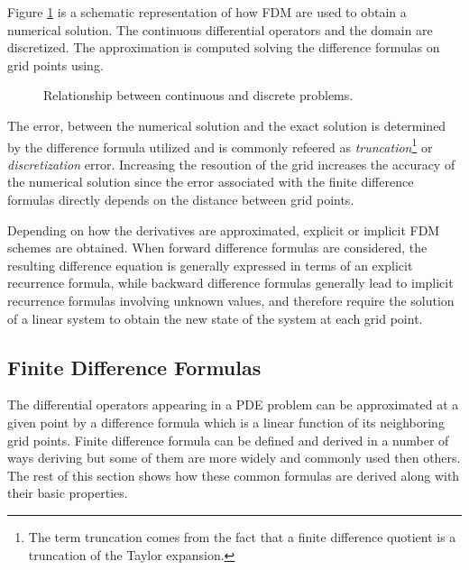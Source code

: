 Figure \ref{fig:schematic_repr_fdm} is a schematic representation of how FDM are used to obtain a numerical solution. The continuous differential operators and the domain are discretized. The approximation is computed solving the difference formulas on grid points using.

   

\begin{figure}[b]
    \centering
    \caption{Relationship between continuous and discrete problems.}
    \label{fig:schematic_repr_fdm}
\end{figure}
    
    The error, between the numerical solution and the exact solution is determined by the difference formula utilized and is commonly refeered as \textit{truncation}\footnote{The term truncation comes from the fact that a finite difference quotient is a truncation of the Taylor expansion.} or \textit{discretization} error.  Increasing the resoution of the grid increases the accuracy of the numerical solution since the error associated with the finite difference formulas directly depends on the distance between grid points.
    
        
    Depending on how the derivatives are approximated, explicit or implicit FDM schemes are
    obtained. When forward difference formulas are considered, the
    resulting difference equation is generally expressed in terms of
    an explicit recurrence formula, while backward difference formulas
    generally lead to implicit recurrence formulas involving unknown
    values, and therefore require the solution of a linear system to
    obtain the new state of the system at each grid point.
    
    
\subsection{Finite Difference Formulas}
The differential operators appearing in a PDE problem can be approximated at a given point by a difference formula which is a linear function of its neighboring grid points. Finite difference formula can be defined and derived in a number of ways deriving but some of them are more widely and commonly used then others. The rest of this section shows how these common formulas are derived along with their basic properties. 

